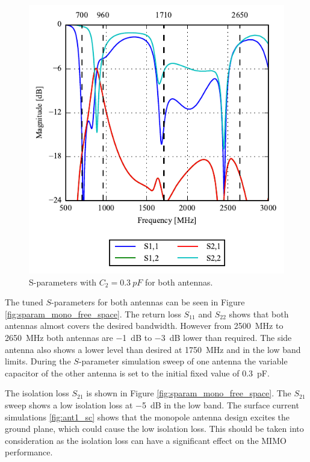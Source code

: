 \begin{figure}[htbp]
    \centering
    \includegraphics{img/tech_sol/monopole/ant1_sparam}
    \caption{S-parameters with $C_2=\SI{0.3}{pF}$ for both antennas.}
    \label{fig:ant1_sparam}
\end{figure}
The tuned $S$-parameters for both antennas can be seen in Figure \ref{fig:sparam_mono_free_space}. The return loss $S_{11}$ and $S_{22}$ shows that both antennas almost covers the desired bandwidth. However from \SI{2500}{MHz} to \SI{2650}{MHz} both antennas are \SI{-1}{dB} to \SI{-3}{dB} lower than required. The side antenna also shows a lower level than desired at \SI{1750}{MHz} and in the low band limits. During the $S$-parameter simulation sweep of one antenna the variable capacitor of the other antenna is set to the initial fixed value of \SI{0.3}{pF}. 

The isolation loss $S_{21}$ is shown in Figure \ref{fig:sparam_mono_free_space}. The $S_{21}$ sweep shows a low isolation loss at \SI{-5}{dB} in the low band. The surface current simulations \ref{fig:ant1_sc} shows that the monopole antenna design excites the ground plane, which could cause the low isolation loss. This should be taken into consideration as the isolation loss can have a significant effect on the MIMO performance.      

